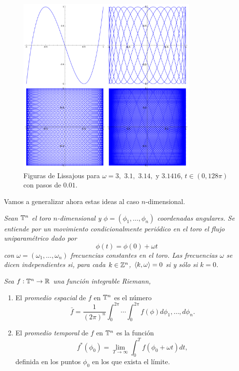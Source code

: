 \begin{figure}[h!]
  \centering
  \includegraphics[width=0.8\textwidth]{pics/lissajous}
  \caption{\small Figuras de Lissajous para $\omega=3,$ $3.1,$ $3.14,$  y $3.1416$, $t \in (0,128\pi)$ con pasos de $0.01$.}
  \label{fig:lissajous}
\end{figure}

Vamos a generalizar ahora estas ideas al caso $n$-dimensional.

\begin{defn}
  \em
  Sean $\mathbb{T}^n$ el toro $n$-dimensional y $\phi=(\phi_1,\dots,\phi_n)$ coordenadas angulares. Se entiende por un \emph{movimiento condicionalmente periódico} en el toro el flujo uniparamétrico dado por 
  \begin{equation*}
    \phi(t)=\phi(0)+\omega t
  \end{equation*}
  con $\omega=(\omega_1,\dots,\omega_n)$ \emph{frecuencias} constantes en el toro. Las frecuencias $\omega$ se dicen \emph{independientes} si, para cada $k \in \mathbb{Z}^n$,  $\left\langle k,\omega\right\rangle=0$ si y sólo si $k=0$.
\end{defn}
\begin{defn}
  \em
  Sea $f:\mathbb{T}^n \rightarrow \mathbb{R}$ una función integrable Riemann,
  \begin{enumerate}
    \item El \emph{promedio espacial} de $f$ en $\mathbb{T}^n$ es el número
      \begin{equation*}
	\bar{f}=\frac{1}{(2\pi)^n}\int_0^{2\pi} \cdots \int_0^{2\pi} f(\phi) d\phi_1,\dots,d\phi_n.
      \end{equation*}
    \item El \emph{promedio temporal} de $f$ en $\mathbb{T}^n$ es la función
      \begin{equation*}
	f^*(\phi_0)=\lim_{T\rightarrow \infty} \int_0^{T}f(\phi_0+\omega t) dt,
      \end{equation*}
      definida en los puntos $\phi_0$ en los que exista el límite.
  \end{enumerate}
\end{defn}

